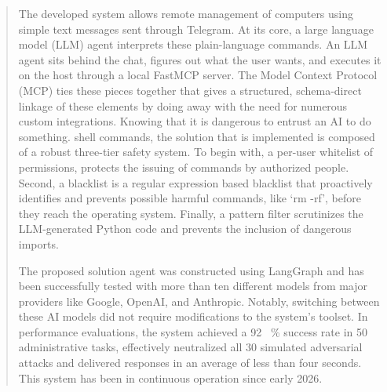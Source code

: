 \documentclass[conference]{IEEEtran}
\begin{document}
\begin{abstract}

The developed system allows remote management of computers using simple text messages sent through Telegram. At its core, a large language model (LLM) agent interprets these plain-language commands.  An LLM agent sits behind the chat, figures out what the user wants, and executes it on the host through a local FastMCP server. The Model Context Protocol (MCP) ties these pieces together that gives a structured, schema-direct linkage of these elements by doing away with the need for numerous custom integrations. Knowing that it is dangerous to entrust an AI to do something.
shell commands, the solution that is implemented is composed of a robust three-tier safety system. To begin with, a per-user whitelist of permissions, protects the issuing of commands by authorized people.
Second, a blacklist is a regular expression based blacklist that proactively identifies and prevents possible harmful commands, like ‘rm -rf’, before they reach the operating system. Finally, a pattern filter scrutinizes the LLM-generated Python code and  prevents the inclusion of dangerous imports.

The proposed solution agent was constructed using LangGraph and has been successfully tested with more than ten different models from major providers like Google, OpenAI, and Anthropic. Notably, switching between these AI models did not require modifications to the system's toolset. In performance evaluations, the system achieved a 92 \, \% success rate in 50 administrative tasks, effectively neutralized all 30 simulated adversarial attacks and delivered responses in an average of less than four seconds. This system has been in continuous operation since early 2026.

\end{abstract}
\end{document}
